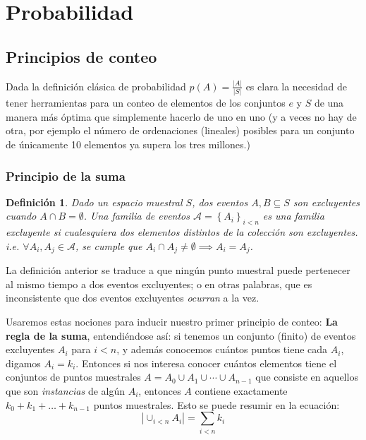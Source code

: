 \documentclass[spanish]{report}
\newtheorem{defi}[thm]{Definición}
\newcommand{\card}[1]{\left|#1 \right|}
\begin{document}
	
\section{Probabilidad}


\subsection{Principios de conteo}

Dada la definición clásica de probabilidad $p(A) = \frac{\card{A}}{\card{S}}$ es clara la necesidad de tener herramientas para un conteo de elementos de los conjuntos $e$ y $S$ de una manera más óptima que simplemente hacerlo de uno en uno (y a veces no hay de otra, por ejemplo el número de ordenaciones (lineales) posibles para un conjunto de únicamente 10 elementos ya supera los tres millones.)

\subsubsection{Principio de la suma}
\begin{defi}
	Dado un espacio muestral $S$, dos eventos $A, B \subseteq S$ son \emph{excluyentes} cuando $A \cap B = \emptyset$. 
	Una familia de eventos $\mathcal{A}= \left\lbrace A_i \right\rbrace_{i<n}$ es una \emph{familia excluyente} si cualesquiera dos elementos distintos de la colección son excluyentes. i.e. $\forall A_i, A_j \in \mathcal{A}$, se cumple que $A_i \cap A_j \neq \emptyset \implies A_i = A_j$.
\end{defi}

La definición anterior se traduce a que ningún punto muestral puede pertenecer al mismo tiempo a dos eventos excluyentes; o en otras palabras, que es inconsistente que dos eventos excluyentes \emph{ocurran} a la vez.

Usaremos estas nociones para inducir nuestro primer principio de conteo: \textbf{La regla de la suma}, entendiéndose así:
si tenemos un conjunto (finito) de eventos excluyentes $A_i$ para $i<n$, y además conocemos cuántos puntos tiene cada $A_i$, digamos $A_i = k_i$. Entonces si nos interesa conocer cuántos elementos tiene el conjuntos de puntos muestrales $A = A_0 \cup A_1 \cup \cdots \cup A_{n-1}$ que consiste en aquellos que son \emph{instancias} %
de algún $A_i$, entonces $A$ contiene exactamente $k_0 + k_1 + \ldots + k_{n-1}$ puntos muestrales.
Esto se puede resumir en la ecuación:
\begin{equation}\label{eq_PrincipioSuma}
	\card{\cup_{i<n} A_i} = \sum_{i<n} k_i
\end{equation}
\end{document}
